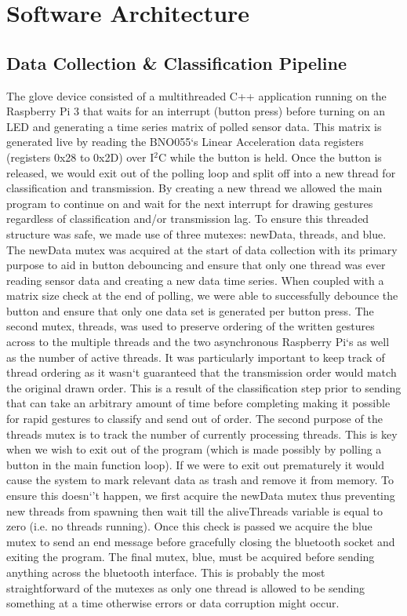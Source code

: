 \documentclass{sig-alternate-05-2015}
\begin{document}
\section{Software Architecture}

\subsection{Data Collection \& Classification Pipeline}
The glove device consisted of a multithreaded C++ application running on the Raspberry Pi 3 that waits for an interrupt (button press) before turning on an LED and generating a time series matrix of polled sensor data. This matrix is generated live by reading the BNO055`s Linear Acceleration data registers (registers 0x28 to 0x2D) over I$^2$C while the button is held. Once the button is released, we would exit out of the polling loop and split off into a new thread for classification and transmission. By creating a new thread we allowed the main program to continue on and wait for the next interrupt for drawing gestures regardless of classification and/or transmission lag. To ensure this threaded structure was safe, we made use of three mutexes: newData, threads, and blue. The newData mutex was acquired at the start of data collection with its primary purpose to aid in button debouncing and ensure that only one thread was ever reading sensor data and creating a new data time series. When coupled with a matrix size check at the end of polling, we were able to successfully debounce the button and ensure that only one data set is generated per button press. The second mutex, threads, was used to preserve ordering of the written gestures across to the multiple threads and the two asynchronous Raspberry Pi`s as well as the number of active threads. It was particularly important to keep track of thread ordering as it wasn`t guaranteed that the transmission order would match the original drawn order. This is a result of the classification step prior to sending that can take an arbitrary amount of time before completing making it possible for rapid gestures to classify and send out of order. The second purpose of the threads mutex is to track the number of currently processing threads. This is key when we wish to exit out of the program (which is made possibly by polling a button in the main function loop). If we were to exit out prematurely it would cause the system to mark relevant data as trash and remove it from memory. To ensure this doesn`'t happen, we first acquire the newData mutex thus preventing new threads from spawning then wait till the aliveThreads variable is equal to zero (i.e. no threads running). Once this check is passed we acquire the blue mutex to send an end message before gracefully closing the bluetooth socket and exiting the program. The final mutex, blue, must be acquired before sending anything across the bluetooth interface. This is probably the most straightforward of the mutexes as only one thread is allowed to be sending something at a time otherwise errors or data corruption might occur.
\end{document}
